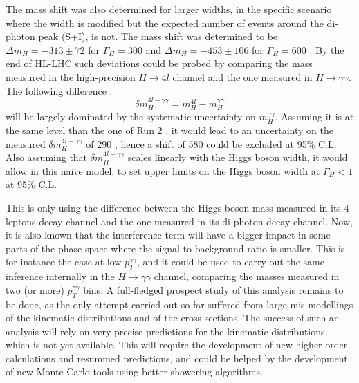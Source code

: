 The mass shift was also determined for larger widths, in the specific scenario where the width is modified but the expected number of events around the di-photon peak (S+I), is not. The mass shift was determined to be $\Delta m_H = -313\pm 72$ \UMeV for $\Gamma_H = 300$ \UMeV and $\Delta m_H = -453 \pm 106$ \UMeV for $\Gamma_H = 600$ \UMeV. By the end of HL-LHC such deviations could be probed by comparing the mass measured in the high-precision $H\rightarrow 4l$ channel and the one measured in $H\rightarrow\gamma\gamma$. The following difference :
\begin{equation}
    \delta m_H^{4l-\gamma\gamma} = m_H^{4l} - m_H^{\gamma\gamma}
\end{equation}
will be largely dominated by the systematic uncertainty on $m_H^{\gamma\gamma}$. Assuming it is at the same level than the one of Run 2 \cite{Aaboud:2018wps}, it would lead to an uncertainty on the measured $\delta m_H^{4l-\gamma\gamma}$ of 290 \UMeV, hence a shift of 580 \UMeV could be excluded at 95\% C.L. Also assuming that $\delta m_H^{4l-\gamma\gamma}$ scales linearly with the Higgs boson width, it would allow in this naive model, to set upper limits on the Higgs boson width at $\Gamma_H < 1$ \UGeV at 95\% C.L.

This is only using the difference between the Higgs boson mass measured in its 4 leptons decay channel and the one measured in its di-photon decay channel. Now, it is also known that the interference term will have a bigger impact in some parts of the phase space where the signal to background ratio is smaller. This is for instance the case at low $p_T^{\gamma\gamma}$, and it could be used to carry out the same inference internally in the $H\rightarrow\gamma\gamma$ channel, comparing the masses measured in two (or more) $p_T^{\gamma\gamma}$ bins. A full-fledged prospect study of this analysis remains to be done, as the only attempt carried out so far \cite{ATL-PHYS-PUB-2013-014} suffered from large mis-modellings of the kinematic distributions and of the cross-sections. The success of such an analysis will rely on very precise predictions for the kinematic distributions, which is not yet available. This will require the development of new higher-order calculations and resummed predictions, and could be helped by the development of new Monte-Carlo tools using better showering algorithms.